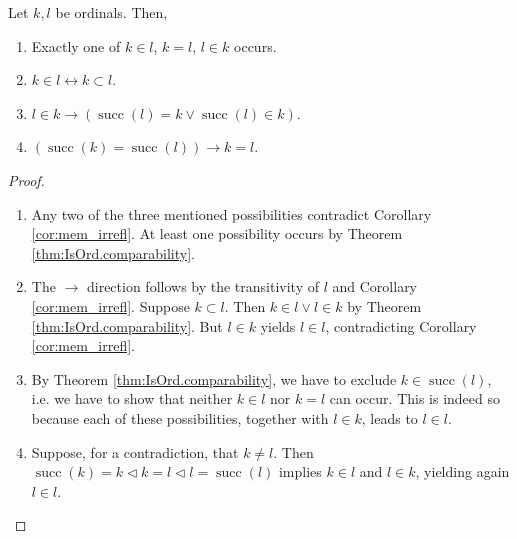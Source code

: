 \begin{corollary}
    \label{cor:IsOrd.exclusive_comparability+...+IsOrd.succ_inj}
    \leanok
    Let $k,l$ be ordinals. Then,
    \begin{enumerate}
        \item Exactly one of $k\in l$, $k=l$, $l \in k$ occurs.
        \item $k\in l \leftrightarrow k \subset l$.
        \item $l \in k \rightarrow (\operatorname{succ}(l)=k \lor \operatorname{succ}(l)\in k)$.
        \item $(\operatorname{succ}(k) = \operatorname{succ}(l) )\rightarrow k = l$.
    \end{enumerate}
\end{corollary}

\begin{proof}
    \leanok
    \leavevmode
    \begin{enumerate}
        \item Any two of the three mentioned possibilities contradict 
        Corollary \ref{cor:mem_irrefl}. 
        At least one possibility occurs by Theorem \ref{thm:IsOrd.comparability}.
        \item The $\rightarrow$ direction follows by the transitivity of $l$ and 
        Corollary \ref{cor:mem_irrefl}. 
        Suppose $k \subset l$. Then $k \in l \lor l \in k$ by Theorem \ref{thm:IsOrd.comparability}. 
        But $l \in k$ yields $l \in l$, contradicting Corollary \ref{cor:mem_irrefl}.
        \item By Theorem \ref{thm:IsOrd.comparability}, we have to exclude $k \in 
        \operatorname{succ}(l)$, i.e. we have to show that neither $k\in l$ nor $k=l$ can occur. 
        This is indeed so because each of these possibilities, together with $l\in k$, 
        leads to $l \in l$.
        \item Suppose, for a contradiction, that $k \neq l$. 
        Then $\operatorname{succ}(k) = k \lhd k = l \lhd l = \operatorname{succ}(l)$ 
        implies $k \in l$ and $l \in k$, yielding again $l \in l$.
    \end{enumerate}
\end{proof}

